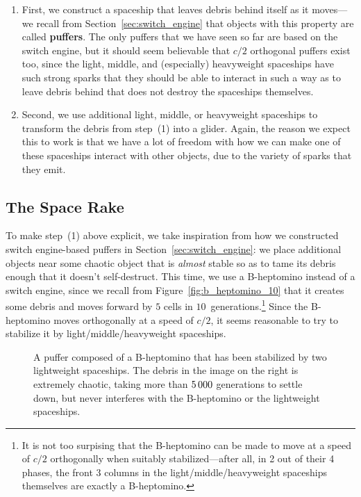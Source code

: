 \begin{enumerate}
	\item[1)] First, we construct a spaceship that leaves debris behind itself as it moves---we recall from Section~\ref{sec:switch_engine} that objects with this property are called \textbf{puffers}. The only puffers that we have seen so far are based on the switch engine, but it should seem believable that $c/2$ orthogonal puffers exist too, since the light, middle, and (especially) heavyweight spaceships have such strong sparks that they should be able to interact in such a way as to leave debris behind that does not destroy the spaceships themselves.\smallskip
	
	\item[2)] Second, we use additional light, middle, or heavyweight spaceships to transform the debris from step~(1) into a glider. Again, the reason we expect this to work is that we have a lot of freedom with how we can make one of these spaceships interact with other objects, due to the variety of sparks that they emit.
\end{enumerate}


\subsection{The Space Rake}\label{sec:space_rake}

To make step~(1) above explicit, we take inspiration from how we constructed switch engine-based puffers in Section~\ref{sec:switch_engine}: we place additional objects near some chaotic object that is \emph{almost} stable so as to tame its debris enough that it doesn't self-destruct. This time, we use a B-heptomino instead of a switch engine, since we recall from Figure~\ref{fig:b_heptomino_10} that it creates some debris and moves forward by $5$ cells in $10$~generations.\footnote{It is not too surpising that the B-heptomino can be made to move at a speed of $c/2$ orthogonally when suitably stabilized---after all, in 2 out of their 4 phases, the front 3 columns in the light/middle/heavyweight spaceships themselves are exactly a B-heptomino.} Since the B-heptomino moves orthogonally at a speed of $c/2$, it seems reasonable to try to stabilize it by light/middle/heavyweight spaceships.

\begin{figure}[!htb]
	\centering{}
	\caption{A puffer composed of a B-heptomino that has been stabilized by two lightweight spaceships. The debris in the image on the right is extremely chaotic, taking more than $5{\,}000$ generations to settle down, but never interferes with the B-heptomino or the lightweight spaceships.}\label{fig:puffer_2}
\end{figure}

